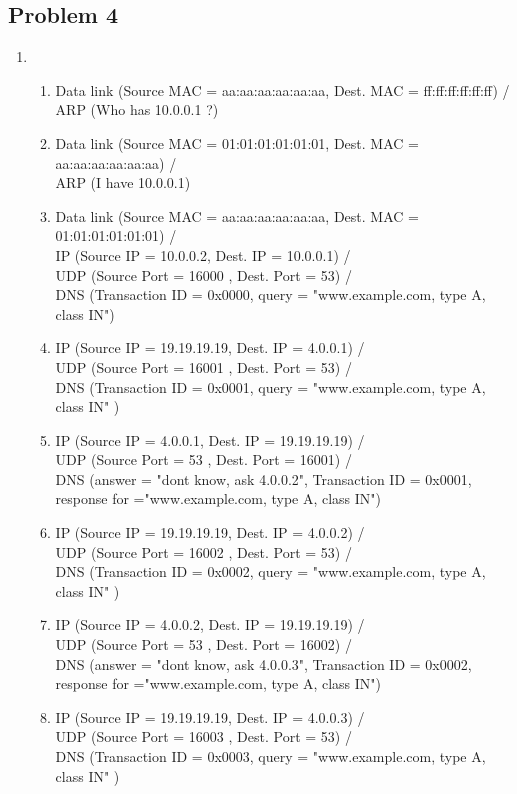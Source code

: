 \documentclass[12pt, german]{article}
\begin{document}
     \subsection*{Problem 4}
     \begin{enumerate}[label=\alph*)]
     	\item ~\par
     			\begin{enumerate}[label=\arabic*.]
     		\item Data link (Source MAC = aa:aa:aa:aa:aa:aa, Dest. MAC = ff:ff:ff:ff:ff:ff) / \\ ARP (Who has 10.0.0.1 ?)
     		\item Data link (Source MAC = 01:01:01:01:01:01, Dest. MAC = aa:aa:aa:aa:aa:aa) /\\ ARP (I have 10.0.0.1)
     		\item Data link (Source MAC = aa:aa:aa:aa:aa:aa, Dest. MAC = 01:01:01:01:01:01) /\\  IP (Source IP = 10.0.0.2, Dest. IP = 10.0.0.1) /\\ UDP (Source Port = 16000 , Dest. Port = 53) /\\ 	DNS (Transaction ID = 0x0000, query = "www.example.com, type A, class IN")
     		\item IP (Source IP = 19.19.19.19, Dest. IP = 4.0.0.1) /\\ UDP (Source Port = 16001 , Dest. Port = 53) /\\ 	DNS (Transaction ID = 0x0001, query = "www.example.com, type A, class IN" )
     		\item IP (Source IP = 4.0.0.1, Dest. IP = 19.19.19.19) /\\ UDP (Source Port = 53 , Dest. Port = 16001) /\\ 	DNS (answer = "dont know, ask 4.0.0.2", Transaction ID = 0x0001, response for ="www.example.com, type A, class IN")
     		\item IP (Source IP = 19.19.19.19, Dest. IP = 4.0.0.2) /\\ UDP (Source Port = 16002 , Dest. Port = 53) /\\ 	DNS (Transaction ID = 0x0002, query = "www.example.com, type A, class IN" )
     		\item IP (Source IP = 4.0.0.2, Dest. IP = 19.19.19.19) /\\ UDP (Source Port = 53 , Dest. Port = 16002) /\\ 	DNS (answer = "dont know, ask 4.0.0.3", Transaction ID = 0x0002,  response for ="www.example.com, type A, class IN")
     		\item IP (Source IP = 19.19.19.19, Dest. IP = 4.0.0.3) /\\ UDP (Source Port = 16003 , Dest. Port = 53) /\\ 	DNS (Transaction ID = 0x0003, query = "www.example.com, type A, class IN" )

\end{enumerate}
\end{enumerate}
\end{document}
